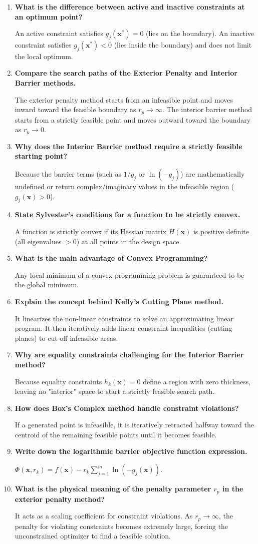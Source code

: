 \documentclass[12pt,a4paper]{article}
\newcommand{\Q}[1]{\textbf{#1}\par\noindent\ignorespaces}
\begin{document}
\begin{tcolorbox}[exambox, title={\textbf{Frequently Asked / Viva Questions}}]
\begin{enumerate}[topsep=0pt, label=\textbf{Q\arabic*.}, itemsep=5pt]
  \item \Q{What is the difference between active and inactive constraints at an optimum point?}
    An active constraint satisfies $g_j(\mathbf{x}^*) = 0$ (lies on the boundary). An inactive constraint satisfies $g_j(\mathbf{x}^*) < 0$ (lies inside the boundary) and does not limit the local optimum.
  \item \Q{Compare the search paths of the Exterior Penalty and Interior Barrier methods.}
    The exterior penalty method starts from an infeasible point and moves inward toward the feasible boundary as $r_p \to \infty$. The interior barrier method starts from a strictly feasible point and moves outward toward the boundary as $r_k \to 0$.
  \item \Q{Why does the Interior Barrier method require a strictly feasible starting point?}
    Because the barrier terms (such as $1/g_j$ or $\ln(-g_j)$) are mathematically undefined or return complex/imaginary values in the infeasible region ($g_j(\mathbf{x}) > 0$).
  \item \Q{State Sylvester's conditions for a function to be strictly convex.}
    A function is strictly convex if its Hessian matrix $H(\mathbf{x})$ is positive definite (all eigenvalues $> 0$) at all points in the design space.
  \item \Q{What is the main advantage of Convex Programming?}
    Any local minimum of a convex programming problem is guaranteed to be the global minimum.
  \item \Q{Explain the concept behind Kelly's Cutting Plane method.}
    It linearizes the non-linear constraints to solve an approximating linear program. It then iteratively adds linear constraint inequalities (cutting planes) to cut off infeasible areas.
  \item \Q{Why are equality constraints challenging for the Interior Barrier method?}
    Because equality constraints $h_k(\mathbf{x}) = 0$ define a region with zero thickness, leaving no "interior" space to start a strictly feasible search path.
  \item \Q{How does Box's Complex method handle constraint violations?}
    If a generated point is infeasible, it is iteratively retracted halfway toward the centroid of the remaining feasible points until it becomes feasible.
  \item \Q{Write down the logarithmic barrier objective function expression.}
    $\Phi(\mathbf{x}, r_k) = f(\mathbf{x}) - r_k \sum_{j=1}^m \ln(-g_j(\mathbf{x}))$.
  \item \Q{What is the physical meaning of the penalty parameter $r_p$ in the exterior penalty method?}
    It acts as a scaling coefficient for constraint violations. As $r_p \to \infty$, the penalty for violating constraints becomes extremely large, forcing the unconstrained optimizer to find a feasible solution.
\end{enumerate}
\end{tcolorbox}
\end{document}
